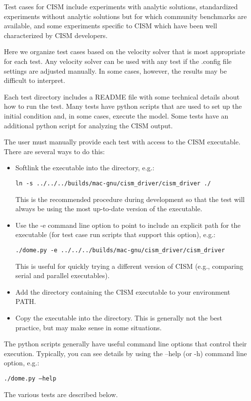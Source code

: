 
\label{ch:tests}

Test cases for CISM include experiments with analytic solutions, standardized experiments
without analytic solutions but for which community benchmarks are available, and
some experiments specific to CISM which have been well characterized by CISM developers.

Here we organize test cases based on the velocity solver that is most appropriate
for each test.  Any velocity solver can be used with any test
if the .config file settings are adjusted manually.  In some cases, however, the results
may be difficult to interpret.

Each test directory includes a README file with some technical details 
about how to run the test.  Many tests have python scripts that are used to set up
the initial condition and, in some cases, execute the model.  Some tests
have an additional python script for analyzing the CISM output.

The user must manually provide each test with access to the CISM executable.
There are several ways to do this:

\begin{itemize}
  \item Softlink the executable into the directory, e.g.:

        \texttt{ln -s ../../../builds/mac-gnu/cism\_driver/cism\_driver ./}

        This is the recommended procedure during development so that the test
        will always be using the most up-to-date version of the executable.

  \item Use the -e command line option to point to include an explicit path for the executable (for test case run scripts that support this option), e.g.:

        \texttt{./dome.py -e ../../../builds/mac-gnu/cism\_driver/cism\_driver}

        This is useful for quickly trying a different version of CISM (e.g., comparing 
        serial and parallel executables).

  \item Add the directory containing the CISM executable to your environment PATH.

  \item Copy the executable into the directory.  This is generally not the best practice,
        but may make sense in some situations.
\end{itemize}

The python scripts generally have useful
command line options that control their execution.  Typically, you can see details 
by using the --help (or -h) command line option, e.g.:

\texttt{./dome.py --help}

The various tests are described below.






